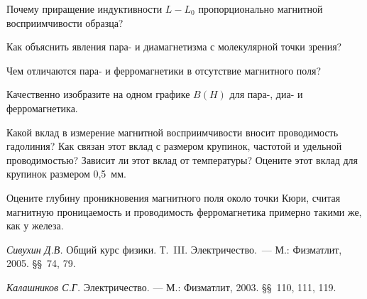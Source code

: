 \begin{lab:questions}

    \item Почему приращение индуктивности $L-L_0$ пропорционально магнитной
    восприимчивости образца?
	\item Как объяснить явления пара- и диамагнетизма с молекулярной точки
зрения?

	\item Чем отличаются пара- и ферромагнетики в отсутствие магнитного поля?


	\item Качественно изобразите на одном графике $B(H)$ для пара-, диа- и
ферромагнетика.

	\item Какой вклад в измерение магнитной восприимчивости вносит проводимость
гадолиния? Как связан этот вклад с размером крупинок, частотой и удельной
проводимостью? Зависит ли этот вклад от температуры? Оцените этот вклад для
крупинок размером 0,5~мм.
\item Оцените  глубину проникновения магнитного поля около точки Кюри, считая
магнитную проницаемость и проводимость ферромагнетика примерно такими же,
как у железа.
\end{lab:questions}


\begin{lab:literature}
	\item \emph {Сивухин Д.В.} Общий курс физики. Т.~III. Электричество.~--- М.:
Физматлит, 2005. \S\S~74, 79.

	\item \emph{Калашников С.Г.} Электричество. --- М.: Физматлит, 2003.
\S\S~110, 111, 119.
\end{lab:literature}


